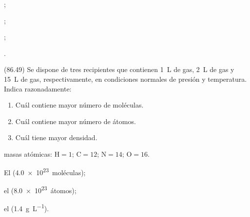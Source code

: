   \begin{solution}
    \begin{enumerate*}
      \item {};
      \item {};
      \item {};
      \item {}.
    \end{enumerate*}
  \end{solution}




  \begin{exercise}[
      tags    = {},
      topics  = {química,química básica},
      source  = {FQ 1B MGH 2016, p86, e49},
    ]
    (86.49) Se dispone de tres recipientes que contienen \SI{1}{\liter} de  gas, \SI{2}{\liter} de  gas y \SI{15}{\liter} de  gas, respectivamente, en condiciones normales de presión y temperatura. Indica razonadamente:

    \begin{enumerate}
      \item Cuál contiene mayor número de moléculas.
      \item Cuál contiene mayor número de átomos.
      \item Cuál tiene mayor densidad.
    \end{enumerate}

    \begin{gexdatos}
      masas atómicas: \( \textrm{H} = 1 \); \( \textrm{C} = 12 \); \( \textrm{N} = 14 \); \( \textrm{O} = 16 \).
    \end{gexdatos}
  \end{exercise}

  \begin{solution}
    \begin{enumerate*}
      \item El  (\SI{4.0e23}{moléculas});
      \item el  (\SI{8.0e23}{átomos});
      \item el  (\SI{1.4}{\gram\per\liter}).
    \end{enumerate*}
  \end{solution}





